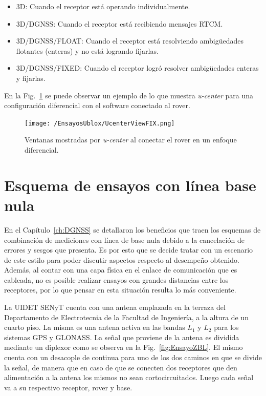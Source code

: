 \documentclass[a4paper,12pt,oneside,onecolumn,final,openright]{book}%
\begin{document}
\begin{itemize}
	\item 3D: Cuando el receptor está operando individualmente.
	\item 3D/DGNSS: Cuando el receptor está recibiendo mensajes RTCM.
	\item 3D/DGNSS/FLOAT: Cuando el receptor está resolviendo ambigüedades flotantes (enteras) y no está logrando fijarlas.
	\item 3D/DGNSS/FIXED: Cuando el receptor logró resolver ambigüedades enteras y fijarlas.
\end{itemize}
	En la Fig.~\ref{fig:ucenter} se puede observar un ejemplo de lo que muestra \textit{u-center} para una configuración diferencial con el software conectado al rover.
\begin{figure}
    \centering
    \texttt{[image: /EnsayosUblox/UcenterViewFIX.png]}
    \caption{Ventanas mostradas por \textit{u-center} al conectar el rover en un enfoque diferencial.}
    \label{fig:ucenter}
\end{figure}

\section{Esquema de ensayos con línea base nula}\label{sec:esquema_ZBL}
	En el Capítulo~\ref{ch:DGNSS} se detallaron los beneficios que traen los esquemas de combinación de mediciones con línea de base nula debido a la cancelación de errores y sesgos que presenta. Es por esto que se decide tratar con un escenario de este estilo para poder discutir aspectos respecto al desempeño obtenido. Además, al contar con una capa física en el enlace de comunicación que es cableada, no es posible realizar ensayos con grandes distancias entre los receptores, por lo que pensar en esta situación resulta lo más conveniente.
	
	La UIDET SENyT cuenta con una antena emplazada en la terraza del Departamento de Electrotecnia de la Facultad de Ingeniería, a la altura de un cuarto piso. La misma es una antena activa en las bandas $L_1$ y $L_2$ para los sistemas GPS y GLONASS. La señal que proviene de la antena es dividida mediante un diplexor como se observa en la Fig.~\ref{fig:EnsayoZBL}. El mismo cuenta con un desacople de continua para uno de los dos caminos en que se divide la señal, de manera que en caso de que se conecten dos receptores que den alimentación a la antena los mismos no sean cortocircuitados. Luego cada señal va a su respectivo receptor, rover y base. 
\end{document}
